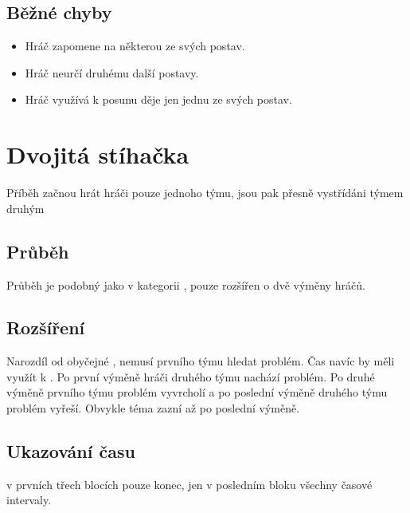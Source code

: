 \subsection{ Běžné chyby } \begin{itemize}
\item  Hráč zapomene na některou ze svých postav.
\item  Hráč neurčí druhému další postavy.
\item  Hráč využívá k posunu děje jen jednu ze svých postav.
\end{itemize}
 
 
 
 
 
 
 
 
\needspace{5cm} \section{Dvojitá stíhačka} \label{dvojitá stíhačka}  
 
Příběh začnou hrát hráči pouze jednoho týmu, jsou pak přesně vystřídáni týmem druhým  
 
\subsection{ Průběh } Průběh je podobný jako v kategorii , pouze rozšířen o dvě výměny hráčů. 
 
\subsection{ Rozšíření } Narozdíl od obyčejné , nemusí  prvního týmu hledat problém. Čas navíc by měli využít k . Po první výměně hráči druhého týmu nachází problém. Po druhé výměně  prvního týmu problém vyvrcholí a po poslední výměně  druhého týmu problém vyřeší. Obvykle téma zazní až po poslední výměně. 
 
\subsection{ Ukazování času }   v prvních třech blocích pouze konec, jen v posledním bloku všechny časové intervaly. 
 
 
 
 
 
